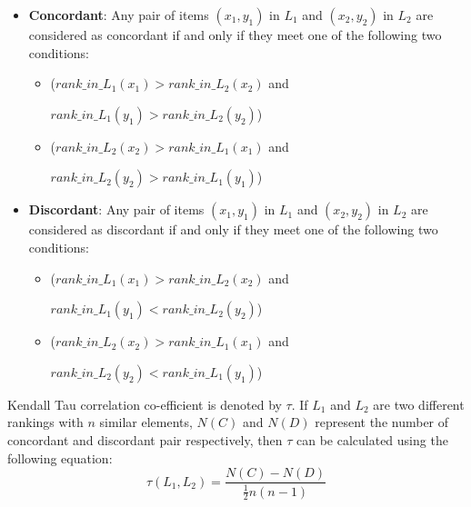 \documentclass[sigconf]{acmart}
\begin{document}
\begin{itemize}
    \item \textbf{Concordant}: Any pair of items $(x_1,y_1)$ in $L_1$ and $(x_2,y_2)$ in $L_2$ are considered as concordant if and only if they meet one of the following two conditions:
    
    \begin{itemize}
        \item ($rank\_in\_L_1(x_1) > rank\_in\_L_2(x_2)$ and 
        
        $rank\_in\_L_1(y_1) > rank\_in\_L_2(y_2)$)
        
        \item ($rank\_in\_L_2(x_2) > rank\_in\_L_1(x_1)$ and 
        
        $rank\_in\_L_2(y_2) > rank\_in\_L_1(y_1)$)
    \end{itemize}
    
    \item \textbf{Discordant}: Any pair of items $(x_1,y_1)$ in $L_1$ and $(x_2,y_2)$ in $L_2$ are considered as discordant if and only if they meet one of the following two conditions:
    
    \begin{itemize}
        \item ($rank\_in\_L_1(x_1) > rank\_in\_L_2(x_2)$ and 
        
        $rank\_in\_L_1(y_1) < rank\_in\_L_2(y_2)$)
        
        \item ($rank\_in\_L_2(x_2) > rank\_in\_L_1(x_1)$ and 
        
        $rank\_in\_L_2(y_2) < rank\_in\_L_1(y_1)$)
    \end{itemize}
\end{itemize}


 
 
Kendall Tau correlation co-efficient is denoted by $\tau$. If $L_1$ and $L_2$ are two different rankings with $n$ similar elements, $N(C)$ and $N(D)$ represent the number of concordant and discordant pair respectively, then $\tau$ can be calculated using the following equation:
\begin{equation}
    \tau(L_1, L_2) = \dfrac{N(C)-N(D)}{\frac{1}{2}n(n-1)}
\end{equation}
\end{document}
